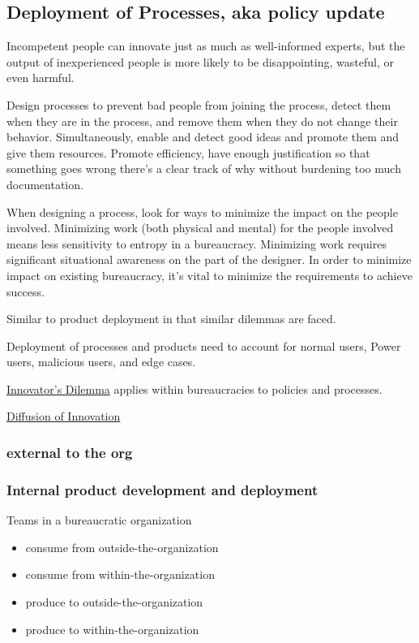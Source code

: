 \subsection{Deployment of Processes, aka policy update}

Incompetent people can innovate just as much as well-informed experts, but the output of inexperienced people is more likely to be disappointing, wasteful, or even harmful. 

Design processes to prevent bad people from joining the process, detect them when they are in the process, and remove them when they do not change their behavior. Simultaneously, enable and detect good ideas and promote them and give them resources.
Promote efficiency, have enough justification so that something goes wrong there's a clear track of why without burdening too much documentation.


When designing a process, look for ways to minimize the impact on the people involved. Minimizing work (both physical and mental) for the people involved means less sensitivity to entropy in a bureaucracy. Minimizing work requires significant situational awareness on the part of the designer. In order to minimize impact on existing bureaucracy, it's vital to minimize the requirements to achieve success.


Similar to product deployment in that similar dilemmas are faced.

Deployment of processes and products need to account for 
normal users, Power users, malicious users, and edge cases.

\href{https://en.m.wikipedia.org/wiki/The_Innovator's_Dilemma}{Innovator's Dilemma} applies within bureaucracies to policies and processes.

\href{https://en.wikipedia.org/wiki/Diffusion_of_innovations}{Diffusion of Innovation}

\subsubsection{external to the org}


\subsubsection{Internal product development and deployment\label{sec:internal_product}}

Teams in a bureaucratic organization 
\begin{itemize}
    \item consume from outside-the-organization
    \item consume from within-the-organization
    \item produce to outside-the-organization
    \item produce to within-the-organization
\end{itemize}

